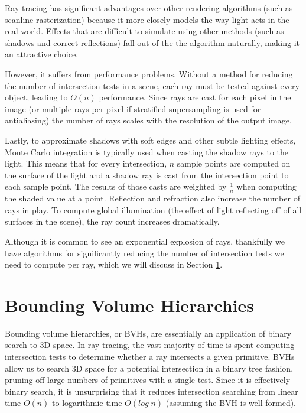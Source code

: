 \documentclass[12pt]{ucthesis}
\begin{document}
Ray tracing has significant advantages over other rendering algorithms (such
as scanline rasterization) because it more closely models the way light acts
in the real world. Effects that are difficult to simulate using other methods
(such as shadows and correct reflections) fall out of the the algorithm naturally,
making it an attractive choice.

However, it suffers from performance problems. Without a method for reducing
the number of intersection tests in a scene, each ray must be tested against
every object, leading to $O(n)$ performance. Since rays are cast for each pixel
in the image (or multiple rays per pixel if stratified supersampling is used
for antialiasing) the number of rays scales with the resolution of the output
image.

Lastly, to approximate shadows with soft edges and other subtle lighting effects,
Monte Carlo integration is typically used when casting the shadow rays to the light.
This means that for every intersection, $n$ sample points are computed on the surface
of the light and a shadow ray is cast from the intersection point to each sample
point. The results of those casts are weighted by $\frac{1}{n}$ when computing the
shaded value at a point. Reflection and refraction also increase the number of
rays in play. To compute global illumination (the effect of light reflecting off
of all surfaces in the scene), the ray count increases dramatically.

Although it is common to see an exponential explosion of rays, thankfully we
have algorithms for significantly reducing the number of intersection tests we
need to compute per ray, which we will discuss in Section \ref{bvhs}.

\section{Bounding Volume Hierarchies}
\label{bvhs}

Bounding volume hierarchies, or BVHs, are essentially an application of binary
search to 3D space. In ray tracing, the vast majority of time is spent
computing intersection tests to determine whether a ray intersects a given
primitive. BVHs allow us to search 3D space for a potential intersection in a
binary tree fashion, pruning off large numbers of primitives with a single
test. Since it is effectively binary search, it is unsurprising that it reduces
intersection searching from linear time $O(n)$ to logarithmic time $O(log\;n)$
(assuming the BVH is well formed).
\end{document}
